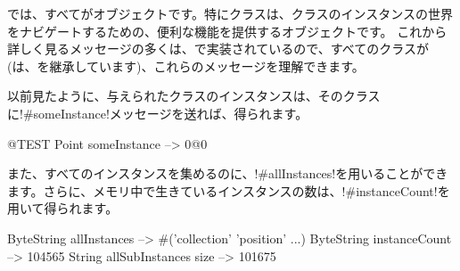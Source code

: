 \documentclass[a4paper,10pt,twoside]{book}
\begin{document}
\st{}では、すべてがオブジェクトです。特にクラスは、クラスのインスタンスの世界をナビゲートするための、便利な機能を提供するオブジェクトです。%
これから詳しく見るメッセージの多くは、で実装されているので、すべてのクラスが(は、を継承しています)、これらのメッセージを理解できます。

以前見たように、与えられたクラスのインスタンスは、そのクラスに\ct!#someInstance!メッセージを送れば、得られます。%
\begin{code}{@TEST} %
Point someInstance --> 0@0
\end{code}

また、すべてのインスタンスを集めるのに、\ct!#allInstances!を用いることができます。さらに、メモリ中で生きているインスタンスの数は、\ct!#instanceCount!を用いて得られます。

\begin{code}{} %
ByteString allInstances        --> #('collection' 'position'  ...)
ByteString instanceCount    --> 104565
String allSubInstances size -->  101675
\end{code}
\end{document}
